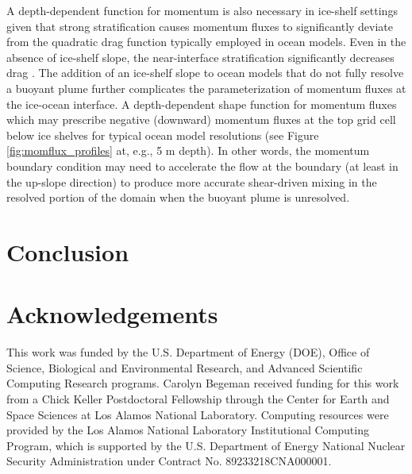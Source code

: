 \documentclass[draft]{agujournal2019}
\begin{document}
A depth-dependent function for momentum is also necessary in ice-shelf settings given that strong stratification causes momentum fluxes to significantly deviate from the quadratic drag function typically employed in ocean models. Even in the absence of ice-shelf slope, the near-interface stratification significantly decreases drag \cite{garcia-villalba_turbulence_2011, mcphee_revisiting_2008}. The addition of an ice-shelf slope to ocean models that do not fully resolve a buoyant plume further complicates the parameterization of momentum fluxes at the ice-ocean interface. A depth-dependent shape function for momentum fluxes which may prescribe negative (downward) momentum fluxes at the top grid cell below ice shelves for typical ocean model resolutions (see Figure \ref{fig:momflux_profiles} at, e.g., 5 m depth). In other words, the momentum boundary condition may need to accelerate the flow at the boundary (at least in the up-slope direction) to produce more accurate shear-driven mixing in the resolved portion of the domain when the buoyant plume is unresolved. 

\section{Conclusion}


\section{Acknowledgements}

This work was funded by the U.S. Department of Energy (DOE), Office of Science, Biological and Environmental Research, and Advanced Scientific Computing Research programs. Carolyn Begeman received funding for this work from a Chick Keller Postdoctoral Fellowship through the Center for Earth and Space Sciences at Los Alamos National Laboratory. Computing resources were provided by the Los Alamos National Laboratory Institutional Computing Program, which is supported by the U.S. Department of Energy National Nuclear Security Administration under Contract No. 89233218CNA000001.

\newpage

\end{document}
